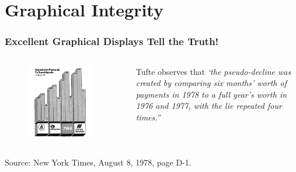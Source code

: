 \documentclass[aspectratio=1610]{beamer}
\begin{document}
\section{Graphical Integrity}

\begin{frame}
	\frametitle{Excellent Graphical Displays Tell the Truth!}
	\begin{columns}
		\begin{column}{0.5\textwidth}
			\begin{figure}
				\begin{small}
					\begin{center}
						\includegraphics[width=0.9\textwidth]{
							images/commission_to_agents.png
						}
					\end{center}
				\end{small}
			\end{figure}
		\end{column}
		\begin{column}{0.5\textwidth}
			Tufte \cite[][page 54]{tufte2001} observes
			that \emph{`the pseudo-decline was created by comparing six months' worth of
				payments in 1978 to a full year's worth in 1976 and 1977, with the
				lie repeated four times.''}
		\end{column}
	\end{columns}
	\footnotesize
	Source: New York Times, August 8, 1978, page D-1.
\end{frame}
\end{document}
